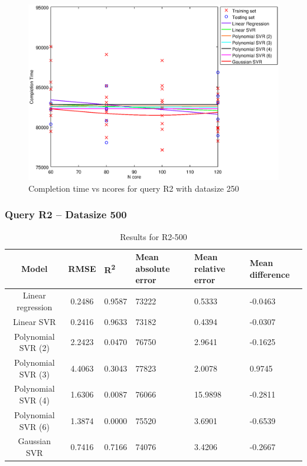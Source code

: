 \documentclass[a4paper,11pt]{article}
\begin{document}
\begin {figure}[hbtp]
\centering
\includegraphics[width=\textwidth]{output/R2_250_LINEAR_NCORE/plot_R2_250.eps}
\caption{Completion time vs ncores for query R2 with datasize 250}
\label{fig:all_linear_R2_250}
\end {figure}

\newpage
\subsubsection{Query R2 -- Datasize 500}
\begin{table}[H]
	\centering
	\begin{adjustbox}{center}
		\begin{tabular}{c | c M{1.2cm} M{2.5cm} M{2.5cm} M{1.8cm}}
			Model & RMSE & R\textsuperscript{2} & Mean absolute error & Mean relative error & Mean difference \tabularnewline
			\hline
			Linear regression & 0.2486 & 0.9587 &  73222 & 0.5333 & -0.0463 \\
			Linear SVR & 0.2416 & 0.9633 &  73182 & 0.4394 & -0.0307 \\
			Polynomial SVR (2) & 2.2423 & 0.0470 &  76750 & 2.9641 & -0.1625 \\
			Polynomial SVR (3) & 4.4063 & 0.3043 &  77823 & 2.0078 & 0.9745 \\
			Polynomial SVR (4) & 1.6306 & 0.0087 &  76066 & 15.9898 & -0.2811 \\
			Polynomial SVR (6) & 1.3874 & 0.0000 &  75520 & 3.6901 & -0.6539 \\
			Gaussian SVR & 0.7416 & 0.7166 &  74076 & 3.4206 & -0.2667 \\
		\end{tabular}
	\end{adjustbox}
	\\
	\caption{Results for R2-500}
	\label{fig:all_linear_R2_500}
\end{table}
\end{document}
